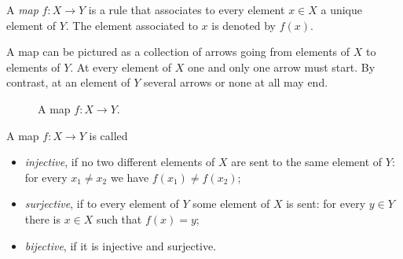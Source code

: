 

\setcounter{section}{2}
\setcounter{subsection}{1}
\setcounter{dfn}{0}

A \emph{map} $f \colon X \to Y$ is a rule that associates to every element $x \in X$ a unique element of $Y$.
The element associated to $x$ is denoted by $f(x)$.

A map can be pictured as a collection of arrows going from elements of $X$ to elements of $Y$.
At every element of $X$ one and only one arrow must start.
By contrast, at an element of $Y$ several arrows or none at all may end.

\begin{figure}[ht]
\begin{center}

\end{center}
\caption{A map $f \colon X \to Y$.}
\label{fig:Map}
\end{figure}

A map $f \colon X \to Y$ is called
\begin{itemize}
\item
\emph{injective}, if no two different elements of $X$ are sent to the same element of $Y$: for every $x_1 \ne x_2$ we have $f(x_1) \ne f(x_2)$;
\item
\emph{surjective}, if to every element of $Y$ some element of $X$ is sent: for every $y \in Y$ there is $x \in X$ such that $f(x) = y$;
\item
\emph{bijective}, if it is injective and surjective.
\end{itemize}



